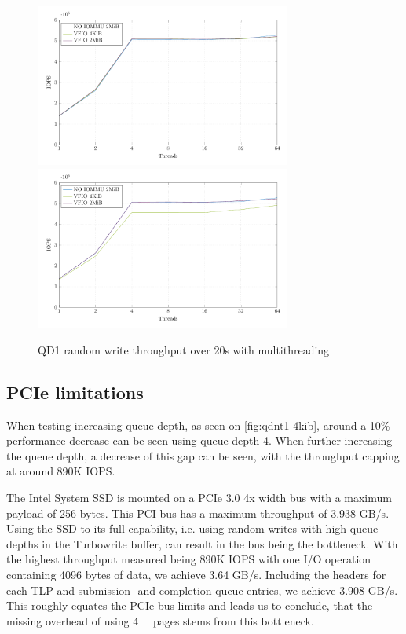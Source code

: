 \begin{figure}[H]
  \centering
   {\includegraphics[width=0.75\textwidth]{figures/qd1tn_1page}}
   {\includegraphics[width=0.75\textwidth]{figures/qd1tn_512page}}
  \caption{QD1 random write throughput over 20s with multithreading}
  \label{fig:qd1tn_4kib}
\end{figure}

\subsection{PCIe limitations}
When testing increasing queue depth, as seen on \autoref{fig:qdnt1-4kib}, around a 10\% performance decrease can be seen using queue depth 4. When further increasing the queue depth, a decrease of this gap can be seen, with the throughput capping at around 890K IOPS.

The Intel System SSD is mounted on a PCIe 3.0 4x width bus with a maximum payload of 256 bytes. This PCI bus has a maximum throughput of 3.938 GB/s. Using the SSD to its full capability, i.e. using random writes with high queue depths in the Turbowrite buffer, can result in the bus being the bottleneck. With the highest throughput measured being 890K IOPS with one I/O operation containing 4096 bytes of data, we achieve 3.64 GB/s. Including the headers for each TLP and submission- and completion queue entries, we achieve 3.908 GB/s. This roughly equates the PCIe bus limits and leads us to conclude, that the missing overhead of using \qty{4}{\kibi\byte} pages stems from this bottleneck.

